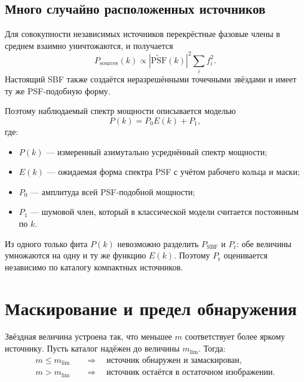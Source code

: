 \documentclass[12pt,a4paper]{article}
\newcommand{\Prpow}{P_{\mathrm r}}
\newcommand{\Psbf}{P_{\mathrm{SBF}}}
\begin{document}
\subsection{Много случайно расположенных источников}

Для совокупности независимых источников перекрёстные фазовые
члены в среднем взаимно уничтожаются, и получается
\begin{equation}
    P_{\mathrm{sources}}(k)
    \propto
    \left|\widetilde{\mathrm{PSF}}(k)\right|^2
    \sum_i f_i^2.
\end{equation}
Настоящий SBF также создаётся неразрешёнными точечными
звёздами и имеет ту же PSF-подобную форму.

Поэтому наблюдаемый спектр мощности описывается моделью
\begin{equation}
    P(k)=P_0E(k)+P_1,
\end{equation}
где:
\begin{itemize}
    \item \(P(k)\) --- измеренный азимутально усреднённый
    спектр мощности;
    \item \(E(k)\) --- ожидаемая форма спектра PSF с учётом
    рабочего кольца и маски;
    \item \(P_0\) --- амплитуда всей PSF-подобной мощности;
    \item \(P_1\) --- шумовой член, который в классической
    модели считается постоянным по \(k\).
\end{itemize}

Из одного только фита \(P(k)\) невозможно разделить
\(\Psbf\) и \(\Prpow\): обе величины умножаются на одну и ту
же функцию \(E(k)\). Поэтому \(\Prpow\) оценивается независимо
по каталогу компактных источников.

\section{Маскирование и предел обнаружения}

Звёздная величина устроена так, что меньшее \(m\) соответствует
более яркому источнику. Пусть каталог надёжен до величины
\(m_{\mathrm{lim}}\). Тогда:
\begin{align}
    m \leq m_{\mathrm{lim}}
    &\quad\Longrightarrow\quad
    \text{источник обнаружен и замаскирован},\\
    m > m_{\mathrm{lim}}
    &\quad\Longrightarrow\quad
    \text{источник остаётся в остаточном изображении}.
\end{align}
\end{document}
